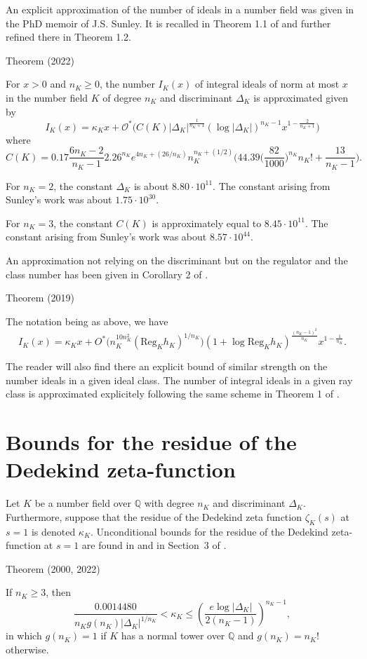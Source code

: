 An explicit approximation of the number of ideals in a number field
was given in the PhD memoir
\cite{Sunley*73}
of J.S. Sunley. It is recalled in Theorem 1.1 of
\cite{Lee*22}
and further refined there in Theorem 1.2.
\par 
\begin{thm}{Theorem (2022)}

    For $x > 0$ and $n_K\ge 0$, the number $I_K(x)$ of integral ideals
    of norm at most $x$ in the
    number field $K$ of degree $n_K$ and discriminant $\Delta_K$ is approximated given by
    $$
    I_K(x)
    =\kappa_K x
    +\mathcal{O}^*\biggl(C(K)|\Delta_K|^{\frac{1}{n_K+1}}(\log|\Delta_K|)^{n_K-1}
    x^{1-\frac{2}{n_K+1}}\biggr)
    $$
    where
    $$
    C(K)=0.17\frac{6n_K-2}{n_K-1}
    2.26^{n_K} e^{4n_K+(26/n_K)}n_K^{n_K+(1/2)}
    \biggl(
    44.39\biggl(\frac{82}{1000}\biggr)^{n_K}n_K!
    +
    \frac{13}{n_K-1}
    \biggr).
    $$


For $n_K=2$, the constant $\Delta_K$ is about $8.80\cdot 10^{11}$. The
constant arising from Sunley's work was about $1.75\cdot 10^{30}$.
\par 
For $n_K=3$, the constant $C(K)$ is approximately equal to $8.45\cdot 10^{11}$. The
constant arising from Sunley's work was about $8.57\cdot 10^{44}$.

An approximation not relying on the discriminant but on the regulator
and the class number has been given in Corollary 2 of
\cite{Debaene*19}.
\par 
Theorem (2019)


  The notation being as above, we have
  $$
  I_K(x)=\kappa_K x
  +O^*\biggl(n_K^{10n_K^2}
  (\text{Reg}_Kh_K)^{1/n_K}\biggr)
  (1+\log\text{Reg}_Kh_K)^{\frac{(n_K-1)^2}{n_K}}
  x^{1-\frac{1}{n_K}}.
  $$
\end{thm}

The reader will also find there an explicit bound of similar strength
on the number ideals in a given ideal class. 
The number of integral ideals in a given ray class is approximated
explicitely following the same scheme in Theorem 1 of
\cite{Gun-Ramare-Sivaraman*22b}.

\section{Bounds for the residue of the Dedekind zeta-function}

Let $K$ be a number field over $\mathbb{Q}$ with degree $n_K$ and
discriminant $\Delta_K$. Furthermore, suppose that the residue of the
Dedekind zeta function $\zeta_K(s)$ at $s=1$ is denoted
$\kappa_K$. Unconditional bounds for the residue of the Dedekind
zeta-function at $s=1$ are found in
\cite{Louboutin*00} and in
Section~3 of
\cite{Garcia-Lee*22}.
\par 
\begin{thm}{Theorem (2000, 2022)}

If $n_K\geq 3$, then
$$
    \frac{0.0014480}{n_K g(n_K){|\Delta_K|}^{1/n_K}}
    < \kappa_K \leq
    \left(\frac{e\log |\Delta_K| }{2(n_K - 1)}\right)^{n_K - 1},
$$
in which $g(n_K)=1$ if $K$ has a normal tower over $\mathbb{Q}$ and
      $g(n_K) = n_K!$ otherwise.
\end{thm}


